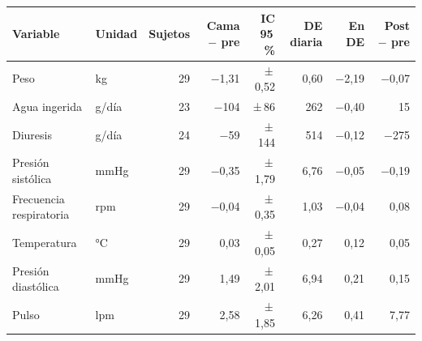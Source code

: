 \begin{tabular}{llrrrrrr}\toprule
 Variable & Unidad & Sujetos & Cama $-$ pre & IC 95\,\% & DE diaria & En DE & Post $-$ pre \\
\midrule
Peso & kg & 29 & −1,31 & ±\,0,52 & 0,60 & −2,19 & −0,07 \\
Agua ingerida & g/día & 23 & −104 & ±\,86 & 262 & −0,40 & 15 \\
Diuresis & g/día & 24 & −59 & ±\,144 & 514 & −0,12 & −275 \\
Presión sistólica & mmHg & 29 & −0,35 & ±\,1,79 & 6,76 & −0,05 & −0,19 \\
Frecuencia respiratoria & rpm & 29 & −0,04 & ±\,0,35 & 1,03 & −0,04 & 0,08 \\
Temperatura & °C & 29 & 0,03 & ±\,0,05 & 0,27 & 0,12 & 0,05 \\
Presión diastólica & mmHg & 29 & 1,49 & ±\,2,01 & 6,94 & 0,21 & 0,15 \\
Pulso & lpm & 29 & 2,58 & ±\,1,85 & 6,26 & 0,41 & 7,77 \\
\bottomrule\end{tabular}
